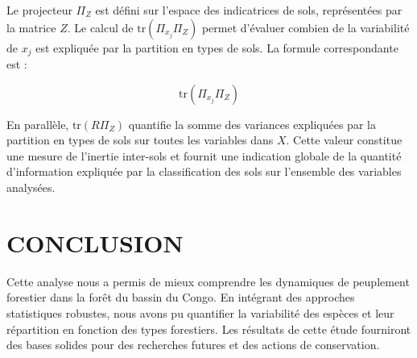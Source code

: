 \documentclass[
]{article}
\begin{document}
Le projecteur \(\Pi_Z\) est défini sur l'espace des indicatrices de
sols, représentées par la matrice \(Z\). Le calcul de
\(\text{tr}(\Pi_{x_j} \Pi_Z)\) permet d'évaluer combien de la
variabilité de \(x_j\) est expliquée par la partition en types de sols.
La formule correspondante est :

\[
\text{tr}(\Pi_{x_j} \Pi_Z)
\]

En parallèle, \(\text{tr}(R \Pi_Z)\) quantifie la somme des variances
expliquées par la partition en types de sols sur toutes les variables
dans \(X\). Cette valeur constitue une mesure de l'inertie inter-sols et
fournit une indication globale de la quantité d'information expliquée
par la classification des sols sur l'ensemble des variables analysées.

\hypertarget{conclusion}{%
\section{CONCLUSION}\label{conclusion}}

Cette analyse nous a permis de mieux comprendre les dynamiques de
peuplement forestier dans la forêt du bassin du Congo. En intégrant des
approches statistiques robustes, nous avons pu quantifier la variabilité
des espèces et leur répartition en fonction des types forestiers. Les
résultats de cette étude fourniront des bases solides pour des
recherches futures et des actions de conservation.
\end{document}
